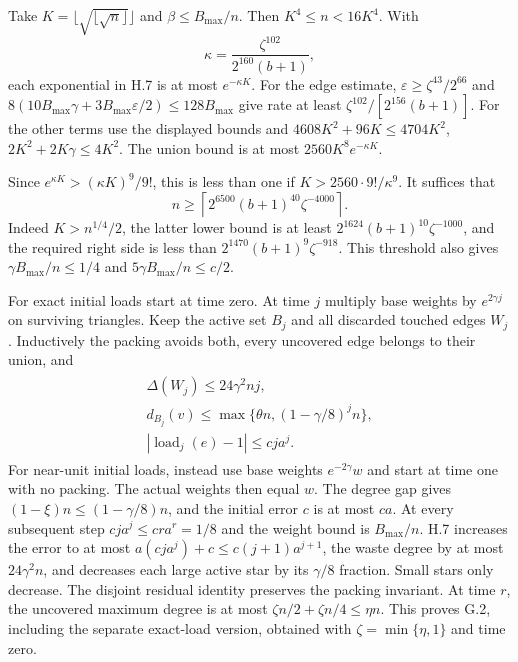 \documentclass[english,11pt,a4paper]{article}
\begin{document}
Take \(K=\lfloor\sqrt{\lfloor\sqrt n\rfloor}\rfloor\) and \(\beta\le B_{\max}/n\). Then \(K^4\le n<16K^4\). With \[\kappa=\frac{\zeta^{102}}{2^{160}(b+1)},\] each exponential in H.7 is at most \(e^{-\kappa K}\). For the edge estimate, \(\varepsilon\ge\zeta^{43}/2^{66}\) and \(8(10B_{\max}\gamma+3B_{\max}\varepsilon/2)\le128B_{\max}\) give rate at least \(\zeta^{102}/[2^{156}(b+1)]\). For the other terms use the displayed bounds and \(4608K^2+96K\le4704K^2\), \(2K^2+2K\gamma\le4K^2\). The union bound is at most \(2560K^8e^{-\kappa K}\).

Since \(e^{\kappa K}>(\kappa K)^9/9!\), this is less than one if \(K>2560\cdot9!/\kappa^9\). It suffices that \[n\ge\left\lceil2^{6500}(b+1)^{40}\zeta^{-4000}\right\rceil.\] Indeed \(K>n^{1/4}/2\), the latter lower bound is at least \(2^{1624}(b+1)^{10}\zeta^{-1000}\), and the required right side is less than \(2^{1470}(b+1)^9\zeta^{-918}\). This threshold also gives \(\gamma B_{\max}/n\le1/4\) and \(5\gamma B_{\max}/n\le c/2\).

For exact initial loads start at time zero. At time \(j\) multiply base weights by \(e^{2\gamma j}\) on surviving triangles. Keep the active set \(B_j\) and all discarded touched edges \(W_j\). Inductively the packing avoids both, every uncovered edge belongs to their union, and \[\begin{gathered}
\begin{gathered}
\Delta(W_j)\le24\gamma^2nj,\\
d_{B_j}(v)\le\max\{\theta n,(1-\gamma/8)^jn\},\\
|\operatorname{load}_j(e)-1|\le cja^j.
\end{gathered}
\end{gathered}\] For near-unit initial loads, instead use base weights \(e^{-2\gamma}w\) and start at time one with no packing. The actual weights then equal \(w\). The degree gap gives \((1-\xi)n\le(1-\gamma/8)n\), and the initial error \(c\) is at most \(ca\). At every subsequent step \(cja^j\le cra^r=1/8\) and the weight bound is \(B_{\max}/n\). H.7 increases the error to at most \(a(cja^j)+c\le c(j+1)a^{j+1}\), the waste degree by at most \(24\gamma^2n\), and decreases each large active star by its \(\gamma/8\) fraction. Small stars only decrease. The disjoint residual identity preserves the packing invariant. At time \(r\), the uncovered maximum degree is at most \(\zeta n/2+\zeta n/4\le\eta n\). This proves G.2, including the separate exact-load version, obtained with \(\zeta=\min\{\eta,1\}\) and time zero.
\end{document}
